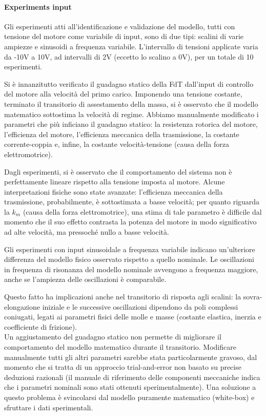 \paragraph{Experiments input}
Gli esperimenti atti all'identificazione e validazione del modello, tutti con tensione del motore come variabile di input, sono di due tipi: scalini di varie ampiezze e sinusoidi a frequenza variabile. 
L'intervallo di tensioni applicate varia da -10V a 10V, ad intervalli di 2V (eccetto lo scalino a 0V), per un totale di 10 esperimenti.

Si è innanzitutto verificato il guadagno statico della FdT dall'input di controllo del motore alla velocità del primo carico. Imponendo una tensione costante, terminato il transitorio di assestamento della massa, si è osservato che il modello matematico sottostima la velocità di regime.
Abbiamo manualmente modificato i parametri che più inficiano il guadagno statico: la resistenza rotorica del motore, l'efficienza del motore, l'efficienza meccanica della trasmissione, la costante corrente-coppia e, infine, la costante velocità-tensione (causa della forza elettromotrice).

Dagli esperimenti, si è osservato che il comportamento del sistema non è perfettamente lineare rispetto alla tensione imposta al motore. Alcune interpretazioni fisiche sono state avanzate: l'efficienza meccanica della trasmissione, probabilmente, è sottostimata a basse velocità; per quanto riguarda la $k_m$ (causa della forza elettromotrice), una stima di tale parametro è difficile dal momento che il suo effetto contrasta la potenza del motore in modo significativo ad alte velocità, ma pressoché nullo a basse velocità.

Gli esperimenti con input sinusoidale a frequenza variabile indicano un'ulteriore differenza del modello fisico osservato rispetto a quello nominale. Le oscillazioni in frequenza di risonanza del modello nominale avvengono a frequenza maggiore, anche se l'ampiezza delle oscillazioni è comparabile.


Questo fatto ha implicazioni anche nel transitorio di risposta agli scalini: la sovra-elongazione iniziale e le successive oscillazioni dipendono da poli complessi coniugati, legati ai parametri fisici delle molle e masse (costante elastica, inerzia e coefficiente di frizione). \\
Un aggiustamento del guadagno statico non permette di migliorare il comportamento del modello matematico durante il transitorio. Modificare manualmente tutti gli altri parametri sarebbe stata particolarmente gravoso, dal momento che si tratta di un approccio trial-and-error non basato su precise deduzioni razionali (il manuale di riferimento delle componenti meccaniche indica che i parametri nominali sono stati ottenuti sperimentalmente).
Una soluzione a questo problema è svincolarsi dal modello puramente matematico (white-box) e sfruttare i dati sperimentali.

